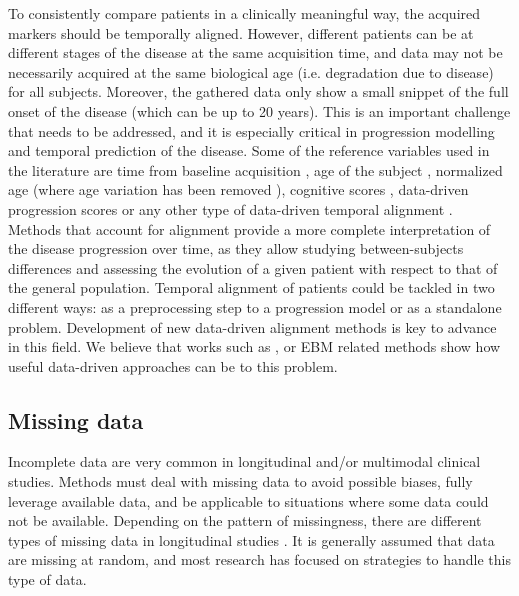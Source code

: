 To consistently compare patients in a clinically meaningful way, the acquired markers should be temporally aligned. However, different patients can be at different stages of the disease at the same acquisition time, and data may not be necessarily acquired at the same biological age (i.e. degradation due to disease) for all subjects. Moreover, the gathered data only show a small snippet of the full onset of the disease (which can be up to 20 years). This is an important challenge that needs to be addressed, and it is especially critical in progression modelling and temporal prediction of the disease. Some of the reference variables used in the literature are time from baseline acquisition \cite{Donohue14,Franke2012}, age of the subject \cite{Bateman2012}, normalized age (where age variation has been removed \cite{Lorenzi2014}), cognitive scores \cite{Guerrero2016,Yang2011}, data-driven progression scores \cite{Casanova2018,Clark2012,Davatzikos2009,Jedynak2012,Schmidt-Richberg2015} or any other type of data-driven temporal alignment \cite{Goyal2018}. \\

Methods that account for alignment provide a more complete interpretation of the disease progression over time, as they allow studying between-subjects differences and assessing the evolution of a given patient with respect to that of the general population. Temporal alignment of patients could be tackled in two different ways: as a preprocessing step to a progression model or as a standalone problem. Development of new data-driven alignment methods is key to advance in this field. We believe that works such as \cite{Bone2018,Goyal2018}, or EBM related methods \cite{Fonteijn2012,Huang2012,Young2014} show how useful data-driven approaches can be to this problem. \\

\subsection{Missing data}

Incomplete data are very common in longitudinal and/or multimodal clinical studies. Methods must deal with missing data to avoid possible biases, fully leverage available data, and be applicable to situations where some data could not be available. Depending on the pattern of missingness, there are different types of missing data in longitudinal studies \cite{Liu2015b}. It is generally assumed that data are missing at random, and most research has focused on strategies to handle this type of data.  \\


